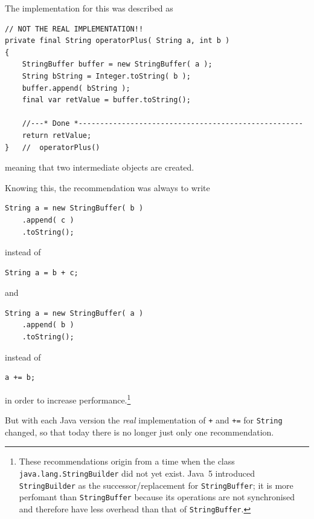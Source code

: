 \documentclass[11pt,a4paper, titlepage, parskip=half, headsepline, footsepline, cleardoublepage=current, headheight=1cm]{scrbook}
\begin{document}
The implementation for this was described as
\begin{lstlisting}
// NOT THE REAL IMPLEMENTATION!!
private final String operatorPlus( String a, int b )
{
    StringBuffer buffer = new StringBuffer( a );
    String bString = Integer.toString( b );
    buffer.append( bString );
    final var retValue = buffer.toString();
    
    //---* Done *----------------------------------------------------
    return retValue;
}   //  operatorPlus()
\end{lstlisting}
meaning that two intermediate objects are created.

Knowing this, the recommendation was always to write
\begin{lstlisting}
String a = new StringBuffer( b )
    .append( c )
    .toString();
\end{lstlisting}
instead of
\begin{lstlisting}
String a = b + c;
\end{lstlisting}
and
\begin{lstlisting}
String a = new StringBuffer( a )
    .append( b )
    .toString();
\end{lstlisting}
instead of
\begin{lstlisting}
a += b;
\end{lstlisting}
in order to increase performance.\footnote{These recommendations origin from a time when the class \lstinline|java.lang.StringBuilder|\autocite{ORACLE_DOC_STRINGBUILDER_CLASS} did not yet exist. Java~5 introduced \lstinline|StringBuilder| as the successor/replacement for \lstinline|StringBuffer|; it is more perfomant than \lstinline|StringBuffer| because its operations are not synchronised and therefore have less overhead than that of \lstinline|StringBuffer|.}

But with each Java version the \textit{real} implementation of \lstinline|+| and \lstinline|+=| for \lstinline|String| changed, so that today there is no longer just only one recommendation.
\end{document}
